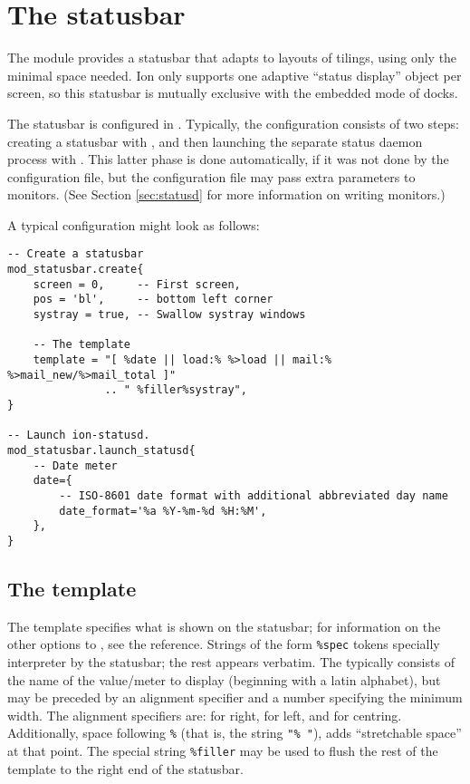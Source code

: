 \section{The statusbar}
\label{sec:statusbar}

The  module provides a statusbar that adapts to 
layouts of tilings, using only the minimal space needed. Ion only 
supports one adaptive ``status display'' object per screen, so this
statusbar is mutually exclusive with the embedded mode of  
docks. 

The statusbar is configured in . Typically,
the configuration consists of two steps: creating a statusbar with
, and then launching the separate
 status daemon process with 
. This latter phase is done
automatically, if it was not done by the configuration file, but
the configuration file may pass extra parameters to 
monitors. (See Section \ref{sec:statusd} for more information on
writing  monitors.)

A typical  configuration might look as follows:


\begin{verbatim}
-- Create a statusbar
mod_statusbar.create{
    screen = 0,     -- First screen, 
    pos = 'bl',     -- bottom left corner
    systray = true, -- Swallow systray windows

    -- The template
    template = "[ %date || load:% %>load || mail:% %>mail_new/%>mail_total ]"
               .. " %filler%systray",
}

-- Launch ion-statusd. 
mod_statusbar.launch_statusd{
    -- Date meter
    date={
        -- ISO-8601 date format with additional abbreviated day name
        date_format='%a %Y-%m-%d %H:%M',
    },      
}
\end{verbatim}


\subsection{The template}

The template specifies what is shown on the statusbar; for information
on the other options to , see the reference. 
Strings of the form \verb!%spec! tokens specially interpreter by
the statusbar; the rest appears verbatim. The  typically
consists of the name of the value/meter to display (beginning with a latin
alphabet), but may be preceded by an alignment specifier and a number
specifying the minimum width. The alignment specifiers are: \code{>}
for right, \code{<} for left,  and \code{|} for centring. Additionally,
space following \verb!%! (that is, the string \verb!"% "!), adds
``stretchable space'' at that point. The special string \verb!%filler!
may be used to flush the rest of the template to the right end of 
the statusbar. 

